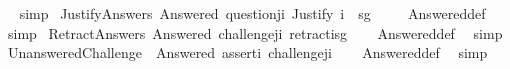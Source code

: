 \begin{isabellebody}
\isadelimproof
\ %
\endisadelimproof
%
\isatagproof
{}\isamarkupfalse%
\ simp%
\endisatagproof
{\isafoldproof}%
%
\isadelimproof
%
\endisadelimproof
\isanewline
{}\isamarkupfalse%
\ JustifyAnswers{\isacharcolon}{\kern0pt}\ {\isachardoublequoteopen}Answered\ {\isacharbrackleft}{\kern0pt}question{\isacharbrackleft}{\kern0pt}j{\isacharcomma}{\kern0pt}i{\isacharcomma}{\kern0pt}{\isasymphi}{\isacharbrackright}{\kern0pt}{\isacharcomma}{\kern0pt}\ Justify\ i\ {\isasymPhi}\ sg\ {\isasymphi}{\isacharbrackright}{\kern0pt}{\isachardoublequoteclose}\isanewline
%
\isadelimproof
\ \ %
\endisadelimproof
%
\isatagproof
{}\isamarkupfalse%
\ Answered{\isacharunderscore}{\kern0pt}def\ \isamarkupfalse%
\ simp%
\endisatagproof
{\isafoldproof}%
%
\isadelimproof
\isanewline
%
\endisadelimproof
{}\isamarkupfalse%
\ RetractAnswers{\isacharcolon}{\kern0pt}\ {\isachardoublequoteopen}Answered\ {\isacharbrackleft}{\kern0pt}challenge{\isacharbrackleft}{\kern0pt}j{\isacharcomma}{\kern0pt}i{\isacharcomma}{\kern0pt}{\isasymphi}{\isacharbrackright}{\kern0pt}{\isacharcomma}{\kern0pt}\ retract{\isacharbrackleft}{\kern0pt}i{\isacharcomma}{\kern0pt}{\isasymphi}{\isacharcomma}{\kern0pt}sg{\isacharbrackright}{\kern0pt}{\isacharbrackright}{\kern0pt}{\isachardoublequoteclose}\isanewline
%
\isadelimproof
\ \ %
\endisadelimproof
%
\isatagproof
{}\isamarkupfalse%
\ Answered{\isacharunderscore}{\kern0pt}def\ \isamarkupfalse%
\ simp%
\endisatagproof
{\isafoldproof}%
%
\isadelimproof
\isanewline
%
\endisadelimproof
{}\isamarkupfalse%
\ UnansweredChallenge{\isacharcolon}{\kern0pt}\ {\isachardoublequoteopen}{\isasymnot}\ Answered\ {\isacharbrackleft}{\kern0pt}assert{\isacharbrackleft}{\kern0pt}i{\isacharcomma}{\kern0pt}{\isasymphi}{\isacharbrackright}{\kern0pt}{\isacharcomma}{\kern0pt}\ challenge{\isacharbrackleft}{\kern0pt}j{\isacharcomma}{\kern0pt}i{\isacharcomma}{\kern0pt}{\isasymphi}{\isacharbrackright}{\kern0pt}{\isacharbrackright}{\kern0pt}{\isachardoublequoteclose}\isanewline
%
\isadelimproof
\ \ %
\endisadelimproof
%
\isatagproof
{}\isamarkupfalse%
\ Answered{\isacharunderscore}{\kern0pt}def\ \isamarkupfalse%
\ simp%
\endisatagproof
{\isafoldproof}%
%
\isadelimproof
%
\endisadelimproof
%
\isadelimdocument
%
\endisadelimdocument
%
\isatagdocument
%
\isamarkuptrue%
%
\endisatagdocument
{\isafolddocument}%
%
\isadelimdocument
%
\endisadelimdocument
{}\isamarkupfalse%

\end{isabellebody}
